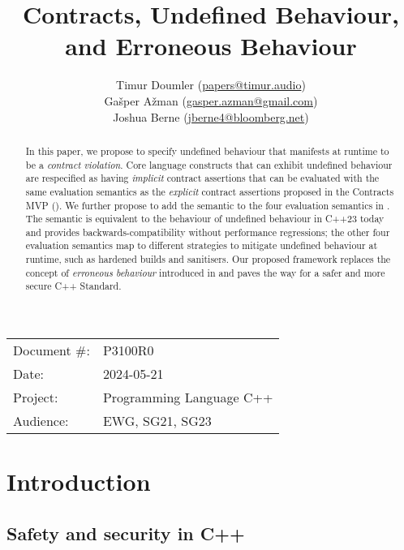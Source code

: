 

 \usepackage[bottom]{footmisc} 


\title{Contracts, Undefined Behaviour, and Erroneous Behaviour}
\author{ Timur Doumler \small(\href{mailto:papers@timur.audio}{papers@timur.audio})  \\
Ga\v sper A\v zman \small(\href{mailto:gasper.azman@gmail.com}{gasper.azman@gmail.com})   \\
Joshua Berne \small(\href{mailto:jberne4@bloomberg.net}{jberne4@bloomberg.net})  
}
\date{}
\maketitle

\begin{tabular}{ll}
Document \#: & P3100R0 \\
Date: &2024-05-21 \\
Project: & Programming Language C++ \\
Audience: & EWG, SG21, SG23
\end{tabular}

\begin{abstract}
In this paper, we propose to specify undefined behaviour that manifests at runtime to be a \emph{contract violation}. Core language constructs that can exhibit undefined behaviour are respecified as having \emph{implicit} contract assertions that can be evaluated with the same evaluation semantics as the \emph{explicit} contract assertions proposed in the Contracts MVP (\cite{P2900R7}). We further propose to add the  semantic to the four evaluation semantics in \cite{P2900R7}. The  semantic is equivalent to the behaviour of undefined behaviour in C++23 today and provides backwards-compatibility without performance regressions; the other four evaluation semantics map to different strategies to mitigate undefined behaviour at runtime, such as hardened builds and sanitisers. Our proposed framework replaces the concept of \emph{erroneous behaviour} introduced in \cite{P2795R5} and paves the way for a safer and more secure C++ Standard.
\end{abstract}

\section{Introduction}
\label{sec:intro}

\subsection{Safety and security in C++}


